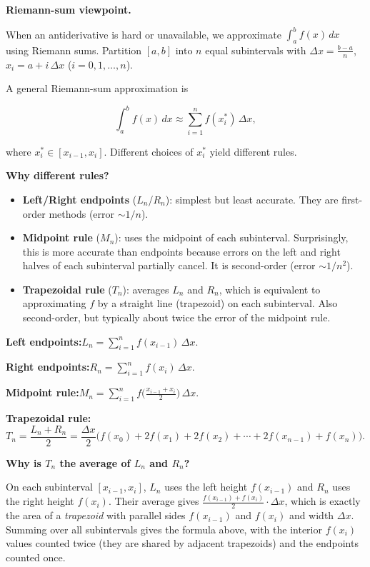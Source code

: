 \textbf{Riemann-sum viewpoint.}

When an antiderivative is hard or unavailable, we approximate $\int_a^b f(x)\,dx$ using Riemann sums. Partition $[a,b]$ into $n$ equal subintervals with $\Delta x=\frac{b-a}{n}$, $x_i=a+i\,\Delta x$ ($i=0,1,\ldots,n$).

A general Riemann-sum approximation is

\[
\int_a^b f(x)\,dx \approx \sum_{i=1}^n f(x_i^*)\,\Delta x,
\]

where $x_i^*\in[x_{i-1},x_i]$. Different choices of $x_i^*$ yield different rules.

\textbf{Why different rules?}

\begin{itemize}[leftmargin=*]
\item \textbf{Left/Right endpoints} ($L_n$/$R_n$): simplest but least accurate. They are first-order methods (error $\sim 1/n$).
\item \textbf{Midpoint rule} ($M_n$): uses the midpoint of each subinterval. Surprisingly, this is more accurate than endpoints because errors on the left and right halves of each subinterval partially cancel. It is second-order (error $\sim 1/n^2$).
\item \textbf{Trapezoidal rule} ($T_n$): averages $L_n$ and $R_n$, which is equivalent to approximating $f$ by a straight line (trapezoid) on each subinterval. Also second-order, but typically about twice the error of the midpoint rule.
\end{itemize}

\begin{keyformula}[title={Key Formula: Endpoint, Midpoint, and Trapezoidal rules}]

\textbf{Left endpoints:}\quad $L_n = \displaystyle\sum_{i=1}^{n}f(x_{i-1})\,\Delta x$.

\textbf{Right endpoints:}\quad $R_n = \displaystyle\sum_{i=1}^{n}f(x_i)\,\Delta x$.

\textbf{Midpoint rule:}\quad $M_n = \displaystyle\sum_{i=1}^{n}f\!\Big(\frac{x_{i-1}+x_i}{2}\Big)\,\Delta x$.

\textbf{Trapezoidal rule:}\quad $T_n = \dfrac{L_n+R_n}{2} = \dfrac{\Delta x}{2}\Big(f(x_0)+2f(x_1)+2f(x_2)+\cdots+2f(x_{n-1})+f(x_n)\Big)$.

\end{keyformula}

\textbf{Why is $T_n$ the average of $L_n$ and $R_n$?}

On each subinterval $[x_{i-1},x_i]$, $L_n$ uses the left height $f(x_{i-1})$ and $R_n$ uses the right height $f(x_i)$. Their average gives $\frac{f(x_{i-1})+f(x_i)}{2}\cdot\Delta x$, which is exactly the area of a \emph{trapezoid} with parallel sides $f(x_{i-1})$ and $f(x_i)$ and width $\Delta x$. Summing over all subintervals gives the formula above, with the interior $f(x_i)$ values counted twice (they are shared by adjacent trapezoids) and the endpoints counted once.

